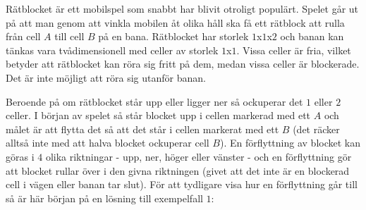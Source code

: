 
\noindent Rätblocket är ett mobilspel som snabbt har blivit otroligt populärt. Spelet går ut på att man genom att vinkla mobilen åt olika håll ska få ett rätblock att rulla från cell $A$ till cell $B$ på en bana. Rätblocket har storlek $1$x$1$x$2$ och banan kan tänkas vara tvådimensionell med celler av storlek $1$x$1$. Vissa celler är fria, vilket betyder att rätblocket kan röra sig fritt på dem, medan vissa celler är blockerade. Det är inte möjligt att röra sig utanför banan.

Beroende på om rätblocket står upp eller ligger ner så ockuperar det $1$ eller $2$ celler. I början av spelet så står blocket upp i cellen markerad med ett $A$ och målet är att flytta det så att det står i cellen markerat med ett $B$ (det räcker alltså inte med att halva blocket ockuperar cell $B$). En förflyttning av blocket kan göras i $4$ olika riktningar - upp, ner, höger eller vänster - och en förflyttning gör att blocket rullar över i den givna riktningen (givet att det inte är en blockerad cell i vägen eller banan tar slut). För att tydligare visa hur en förflyttning går till så är här början på en lösning till exempelfall $1$:

